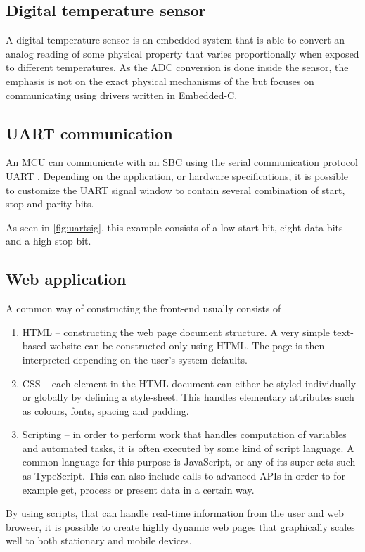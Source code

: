 \subsection{Digital temperature sensor}%
\label{sub:digital_temperature_sensor}
A digital temperature sensor is an embedded system that is able to convert an analog reading of some physical property that varies proportionally when exposed to different temperatures. As the ADC conversion is done inside the sensor, the emphasis is not on the exact physical mechanisms of the but focuses on communicating using drivers written in Embedded-C.

\subsection{UART communication}%
\label{sub:uart}
An MCU can communicate with an SBC using the serial communication protocol UART \cite{trevennorPracticalAVRMicrocontrollers2012}. Depending on the application, or hardware specifications, it is possible to customize the UART signal window to contain several combination of start, stop and parity bits.


As seen in \ref{fig:uartsig}, this example consists of a low start bit, eight data bits and a high stop bit.

\subsection{Web application}%
\label{sub:web_application}
A common way of constructing the front-end usually consists of 
\begin{enumerate}
  \item HTML -- constructing the web page document structure. A very simple text-based website can be constructed only using HTML. The page is then interpreted depending on the user's system defaults.
  \item CSS -- each element in the HTML document can either be styled individually or globally by defining a style-sheet. This handles elementary attributes such as colours, fonts, spacing and padding.  
  \item Scripting -- in order to perform work that handles computation of variables and automated tasks, it is often executed by some kind of script language. A common language for this purpose is JavaScript, or any of its super-sets such as TypeScript. This can also include calls to advanced APIs in order to for example get, process or present data in a certain way.

\end{enumerate}
By using scripts, that can handle real-time information from the user and web browser, it is possible to create highly dynamic web pages that graphically scales well to both stationary and mobile devices.

